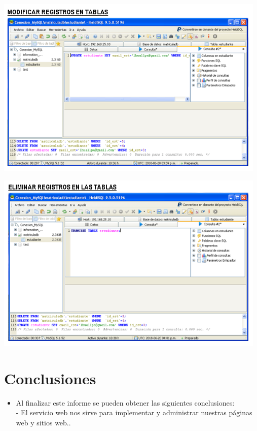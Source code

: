 \begin{itemize}
	\begin{center}
		\includegraphics[width=13cm]{./Imagenes/30a}
		\end{center}
\end{itemize} 

\begin{itemize}
	\begin{center}
		\includegraphics[width=13cm]{./Imagenes/31a}
		\end{center}
\end{itemize} 

\section{Conclusiones} 
\begin{itemize}
	\item  Al finalizar este informe se pueden obtener las siguientes conclusiones:
	\\- El servicio web nos sirve para implementar y administrar nuestras páginas web y sitios web..
\end{itemize}
\\

